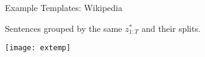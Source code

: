 \begin{frame}{Example Templates: Wikipedia}
  
  Sentences grouped by the same $z_{1:T}^*$ and their splits.

  \begin{center}
    \texttt{[image: extemp]}
  \end{center}
\end{frame}















